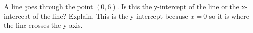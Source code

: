 {A line goes through the point $(0,6)$. Is this the y-intercept of the line or the x-intercept of the line? Explain.}
{This is the y-intercept because $x=0$ so it is where the line crosses the y-axis.}
